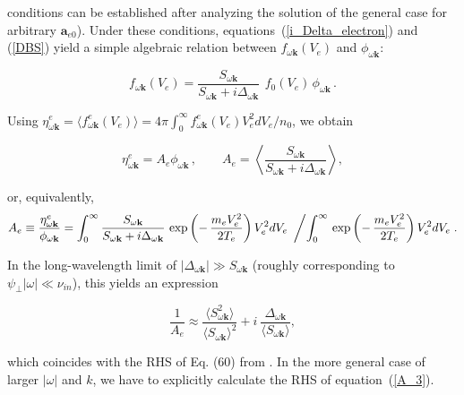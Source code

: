 \documentclass[draft]{agujournal2019}
\renewcommand{\vec}{\mathbf}
\begin{document}
conditions can be established after analyzing the solution of the general case for
arbitrary $\vec{a}_{e0}$). Under these conditions, equations~(\ref{i_Delta_electron}) and (\ref{DBS}) yield a simple
algebraic relation between $f_{\omega\vec{k}}(V_{e})$ and $\phi_{\omega\vec
{k}}$:
\begin{linenomath*}
\[
f_{\omega\vec{k}}(V_{e})=\frac{S_{\omega\vec{k}}}{S_{\omega\vec{k}}
+i\Delta_{\omega\vec{k}}}\ \,f_{0}(V_{e})\,\phi_{\omega\vec{k}}\,.
\]
\end{linenomath*}
Using $\eta_{\omega\vec{k}}^{e}=\langle f_{\omega\vec{k}}^e(V_{e}) \rangle 
= 4\pi\int_{0}^\infty f_{\omega\vec{k}}^e(V_{e})V_e^2dV_e/n_0$, we obtain
\begin{linenomath*}
\begin{equation}
\eta_{\omega\vec{k}}^{e}=A_{e}\phi_{\omega\vec{k}}\,,
\qquad A_{e}=\left\langle\frac{S_{\omega\vec{k}}}{S_{\omega\vec{k}}+i\Delta_{\omega\vec{k}}}\right\rangle, 
\label{elec}%
\end{equation}
\end{linenomath*}
\begin{linenomath*}
or, equivalently,
\begin{equation}
A_{e}\equiv \frac{\eta_{\omega\vec{k}}^{e}}{\phi_{\omega\vec{k}}}=\int_{0}^{\infty}\frac{S_{\omega\vec{k}}}{S_{\omega\vec{k}}
+i\Delta_{\omega\vec{k}}}\,\exp\left(  -\,\frac{m_{e}V_{e}^{2}}{2T_{e}}\right) 
V_{e}^{2}dV_{e}\,\,\left/  \int_{0}^{\infty}\,\exp\left(  -\,\frac
{m_{e}V_{e}^{2}}{2T_{e}}\right)  V_{e}^{2}dV_{e}\right.  . 
\label{A_3}
\end{equation}
\end{linenomath*} 
In the long-wavelength limit of $|\Delta_{\omega\vec{k}}|\gg S_{\omega\vec{k}}$ (roughly corresponding to
$\psi_{\perp}|\omega|\ll\nu_{in}$), this yields an expression
\begin{linenomath*}
\[
\frac{1}{A_{e}}\approx\frac{\langle S_{\omega\vec{k}}^{2}\rangle
}{\langle S_{\omega\vec{k}}\rangle ^{2}}+i\ \frac{\Delta
_{\omega\vec{k}}}{\langle S_{\omega\vec{k}}\rangle },
\]
\end{linenomath*}
which coincides with the RHS of Eq. (60) from .
In the more general case of larger $|\omega|$ and $k$, we have to explicitly
calculate the RHS of equation~(\ref{A_3}). 
\end{document}
